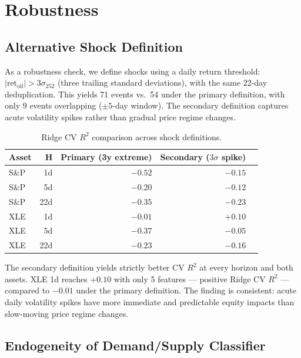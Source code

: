 \documentclass[11pt,a4paper]{article}
\begin{document}
\section{Robustness}
\label{sec:robustness}

\subsection{Alternative Shock Definition}
\label{sec:robustness_alt}

As a robustness check, we define shocks using a daily return threshold: $|\text{ret}_{\text{oil}}| > 3\sigma_{252}$ (three trailing standard deviations), with the same 22-day deduplication. This yields 71 events vs.\ 54 under the primary definition, with only 9 events overlapping ($\pm5$-day window). The secondary definition captures acute volatility spikes rather than gradual price regime changes.

\begin{table}[H]
\centering
\caption{Ridge CV $R^2$ comparison across shock definitions.}
\small
\begin{tabular}{lrrrr}
\toprule
Asset & H & Primary (3y extreme) & Secondary ($3\sigma$ spike) \\
\midrule
S\&P & 1d  & $-0.52$ & $\mathbf{-0.15}$ \\
S\&P & 5d  & $-0.20$ & $\mathbf{-0.12}$ \\
S\&P & 22d & $-0.35$ & $\mathbf{-0.23}$ \\
XLE & 1d  & $-0.01$ & $\mathbf{+0.10}$ \\
XLE & 5d  & $-0.37$ & $\mathbf{-0.05}$ \\
XLE & 22d & $-0.23$ & $\mathbf{-0.16}$ \\
\bottomrule
\end{tabular}
\end{table}

The secondary definition yields strictly better CV $R^2$ at every horizon and both assets. XLE 1d reaches $+0.10$ with only 5 features — positive Ridge CV $R^2$ — compared to $-0.01$ under the primary definition. The finding is consistent: acute daily volatility spikes have more immediate and predictable equity impacts than slow-moving price regime changes.

\subsection{Endogeneity of Demand/Supply Classifier}
\label{sec:robustness_endogeneity}
\end{document}
